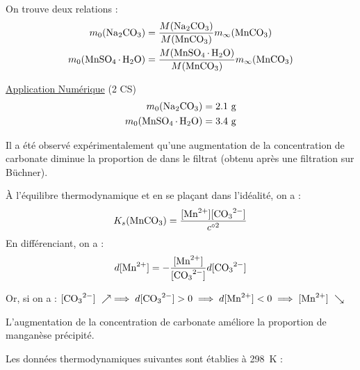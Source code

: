 \documentclass[twoside,a4paper,11pt,addpoints,answers]{exam}%
\begin{document}
\begin{questions}
\begin{mybox}
\begin{solution}[6cm]
On trouve deux relations :
\begin{align*}
m_0 (\ce{Na2CO3}) & = \frac{M (\ce{Na2CO3})}{M( \ce{MnCO3} )} m_\infty ( \ce{MnCO3} ) \\
m_0 (\ce{MnSO4.H2O}) & = \frac{M (\ce{MnSO4.H2O})}{M( \ce{MnCO3} )} m_\infty ( \ce{MnCO3} )
\end{align*}

\underline{Application Numérique} (2 CS)
\begin{align*}
m_0 (\ce{Na2CO3}) &= 2.1 ~ \si{\gram}\\
m_0 (\ce{MnSO4.H2O}) &= 3.4 ~ \si{\gram}
\end{align*}
\end{solution}\end{mybox}

Il a été observé expérimentalement qu'une augmentation de la concentration de carbonate diminue la proportion de  dans le filtrat (obtenu après une filtration sur Büchner).


\begin{mybox}\begin{solution}[3cm]
\`{A} l'équilibre thermodynamique et en se plaçant dans l'idéalité, on a :
\begin{align*}
K_s ( \ce{MnCO3} ) = \frac{[\ce{Mn^{2+}}][\ce{CO3^{2-}}]}{c^{\circ 2}}
\end{align*}
En différenciant, on a :
\begin{align*}
d [ \ce{Mn^{2+}} ] = - \frac{[\ce{Mn^{2+}}]}{[\ce{CO3^{2-}}]} d [\ce{CO3^{2-}}]
\end{align*}

Or, si on a : $[\ce{CO3^{2-}}] ~ \nearrow \implies d[\ce{CO3^{2-}}] > 0 \implies d[\ce{Mn^{2+}}] < 0 \implies [\ce{Mn^{2+}}] ~ \searrow$

L'augmentation de la concentration de carbonate améliore la proportion de manganèse précipité.
\end{solution}\end{mybox}

Les données thermodynamiques suivantes sont établies à \SI{298}{\kelvin} : 


\end{questions}
\end{document}
